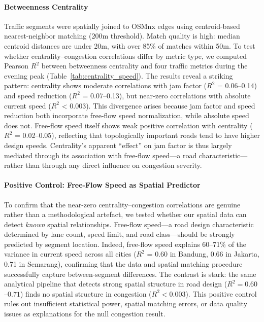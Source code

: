\documentclass[12pt,a4paper]{article}
\begin{document}
\paragraph{Betweenness Centrality}

Traffic segments were spatially joined to OSMnx edges using centroid-based nearest-neighbor matching (200m threshold). Match quality is high: median centroid distances are under 20m, with over 85\% of matches within 50m. To test whether centrality--congestion correlations differ by metric type, we computed Pearson $R^2$ between betweenness centrality and four traffic metrics during the evening peak (Table~\ref{tab:centrality_speed}). The results reveal a striking pattern: centrality shows moderate correlations with jam factor ($R^2$ = 0.06--0.14) and speed reduction ($R^2$ = 0.07--0.13), but near-zero correlations with absolute current speed ($R^2$ < 0.003). This divergence arises because jam factor and speed reduction both incorporate free-flow speed normalization, while absolute speed does not. Free-flow speed itself shows weak positive correlation with centrality ($R^2$ = 0.02--0.05), reflecting that topologically important roads tend to have higher design speeds. Centrality's apparent ``effect'' on jam factor is thus largely mediated through its association with free-flow speed---a road characteristic---rather than through any direct influence on congestion severity.

\paragraph{Positive Control: Free-Flow Speed as Spatial Predictor}

To confirm that the near-zero centrality--congestion correlations are genuine rather than a methodological artefact, we tested whether our spatial data can detect \textit{known} spatial relationships. Free-flow speed---a road design characteristic determined by lane count, speed limit, and road class---should be strongly predicted by segment location. Indeed, free-flow speed explains 60--71\% of the variance in current speed across all cities ($R^2$ = 0.60 in Bandung, 0.66 in Jakarta, 0.71 in Semarang), confirming that the data and spatial matching procedure successfully capture between-segment differences. The contrast is stark: the same analytical pipeline that detects strong spatial structure in road design ($R^2 = 0.60$--$0.71$) finds no spatial structure in congestion ($R^2 < 0.003$). This positive control rules out insufficient statistical power, spatial matching errors, or data quality issues as explanations for the null congestion result.
\end{document}
